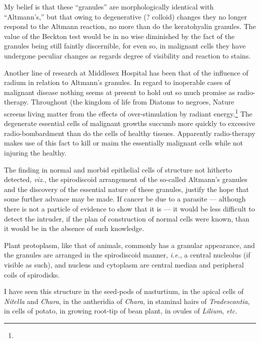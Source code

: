 \documentclass[a4paper, 12pt, oneside]{article}
\begin{document}
My belief is that these ``granules'' are morphologically identical with ``Altmann's,'' but that owing to degenerative (? colloid) changes they no longer respond to the Altmann reaction, no more than do the keratohyalin granules. The value of the Beckton test would be in no wise diminished by the fact of the granules being still faintly discernible, for even so, in malignant cells they have undergone peculiar changes as regards degree of visibility and reaction to stains.

Another line of research at Middlesex Hospital has been that of the influence of radium in relation to Altmann's granules. In regard to inoperable cases of malignant disease nothing seems at present to hold out so much promise as radio-therapy. Throughout (the kingdom of life from Diatoms to negroes, Nature screens living matter from the effects of over-stimulation by radiant energy.\footnote{} The degenerate essential cells of malignant growths succumb more quickly to excessive radio-bombardment than do the cells of healthy tissues. Apparently radio-therapy makes use of this fact to kill or maim the essentially malignant cells while not injuring the healthy.

The finding in normal and morbid epithelial cells of structure not hitherto detected, \emph{viz.}, the spirodiscoid arrangement of the so-called Altmann's granules and the discovery of the essential nature of these granules, justify the hope that some further advance may be made. If cancer be due to a parasite --- although there is not a particle of evidence to show that it is --- it would be less difficult to detect the intruder, if the plan of construction of normal cells were known, than it would be in the absence of such knowledge.

Plant protoplasm, like that of animals, commonly has a granular appearance, and the granules are arranged in the spirodiscoid manner, \emph{i.e.}, a central nucleolus (if visible as such), and nucleus and cytoplasm are central median and peripheral coils of spirodisks.

I have seen this structure in the seed-pods of nasturtium, in the apical cells of \emph{Nitella} and \emph{Chara}, in the antheridia of \emph{Chara}, in staminal hairs of \emph{Tradescantia}, in cells of potato, in growing root-tip of bean plant, in ovules of \emph{Lilium}, \emph{etc.}
\end{document}
